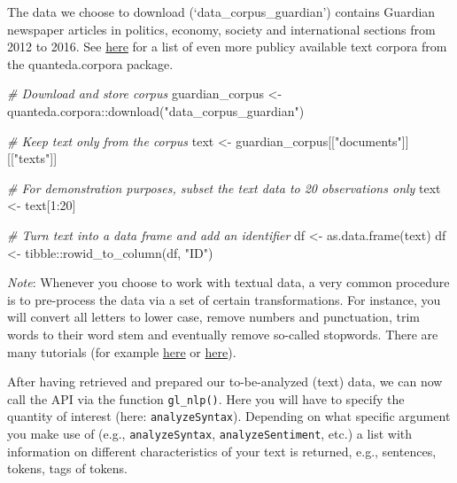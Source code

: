 \documentclass[
]{book}
\newenvironment{Shaded}{\begin{snugshade}}{\end{snugshade}}
\newcommand{\CommentTok}[1]{\textcolor[rgb]{0.56,0.35,0.01}{\textit{#1}}}
\newcommand{\DecValTok}[1]{\textcolor[rgb]{0.00,0.00,0.81}{#1}}
\newcommand{\FunctionTok}[1]{\textcolor[rgb]{0.00,0.00,0.00}{#1}}
\newcommand{\NormalTok}[1]{#1}
\newcommand{\OtherTok}[1]{\textcolor[rgb]{0.56,0.35,0.01}{#1}}
\newcommand{\SpecialCharTok}[1]{\textcolor[rgb]{0.00,0.00,0.00}{#1}}
\newcommand{\StringTok}[1]{\textcolor[rgb]{0.31,0.60,0.02}{#1}}
\begin{document}
The data we choose to download (`data\_corpus\_guardian') contains Guardian newspaper articles in politics, economy, society and international sections from 2012 to 2016. See \href{\%22https://github.com/quanteda/quanteda.corpora\%22}{here} for a list of even more publicy available text corpora from the quanteda.corpora package.

\begin{Shaded}
\begin{Highlighting}[]
\CommentTok{\# Download and store corpus}
\NormalTok{guardian\_corpus }\OtherTok{\textless{}{-}}\NormalTok{ quanteda.corpora}\SpecialCharTok{::}\FunctionTok{download}\NormalTok{(}\StringTok{"data\_corpus\_guardian"}\NormalTok{)}

\CommentTok{\# Keep text only from the corpus}
\NormalTok{text }\OtherTok{\textless{}{-}}\NormalTok{ guardian\_corpus[[}\StringTok{"documents"}\NormalTok{]][[}\StringTok{"texts"}\NormalTok{]]}

\CommentTok{\# For demonstration purposes, subset the text data to 20 observations only}
\NormalTok{text }\OtherTok{\textless{}{-}}\NormalTok{ text[}\DecValTok{1}\SpecialCharTok{:}\DecValTok{20}\NormalTok{]}

\CommentTok{\# Turn text into a data frame and add an identifier}
\NormalTok{df }\OtherTok{\textless{}{-}} \FunctionTok{as.data.frame}\NormalTok{(text)}
\NormalTok{df }\OtherTok{\textless{}{-}}\NormalTok{ tibble}\SpecialCharTok{::}\FunctionTok{rowid\_to\_column}\NormalTok{(df, }\StringTok{"ID"}\NormalTok{)}
\end{Highlighting}
\end{Shaded}

\emph{Note}: Whenever you choose to work with textual data, a very common procedure is to pre-process the data via a set of certain transformations. For instance, you will convert all letters to lower case, remove numbers and punctuation, trim words to their word stem and eventually remove so-called stopwords. There are many tutorials (for example \href{\%22https://datamathstat.wordpress.com/2019/10/25/text-preprocessing-for-nlp-and-machine-learning-using-r/\%22}{here} or \href{\%22http://rstudio-pubs-static.s3.amazonaws.com/256588_57b585da6c054349825cba46685d8464.html\%22}{here}).

After having retrieved and prepared our to-be-analyzed (text) data, we can now call the API via the function \texttt{gl\_nlp()}. Here you will have to specify the quantity of interest (here: \texttt{analyzeSyntax}). Depending on what specific argument you make use of (e.g., \texttt{analyzeSyntax}, \texttt{analyzeSentiment}, etc.) a list with information on different characteristics of your text is returned, e.g., sentences, tokens, tags of tokens.
\end{document}
